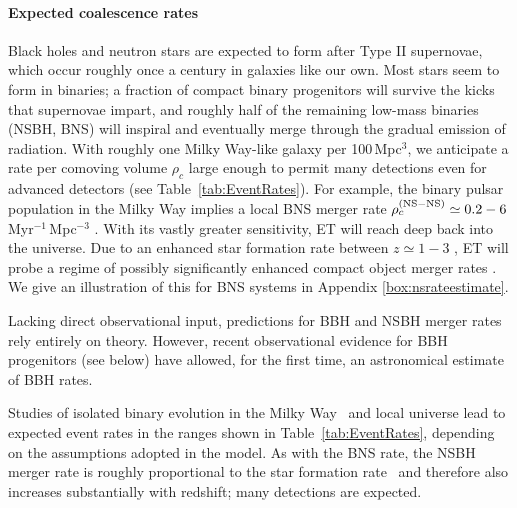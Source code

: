 \paragraph{Expected coalescence rates}
Black holes and neutron stars are expected to form after Type II 
supernovae, which occur roughly once a century in galaxies like our own.  Most stars
seem to form in binaries; a fraction of compact binary progenitors will survive the kicks that
supernovae impart, and roughly half of the remaining low-mass binaries (NSBH, BNS) will 
inspiral and eventually merge through the gradual emission of radiation. With roughly one 
Milky Way-like galaxy per 100\,Mpc$^3$, we anticipate
a rate per comoving volume $\rho_c$ large enough to permit many detections even for advanced
detectors (see Table~\ref{tab:EventRates}).
For example, the binary pulsar population in the Milky Way implies a local BNS merger rate 
$\rho_c^{\rm(NS-NS)}\simeq 0.2-6$\,Myr$^{-1}$\,Mpc$^{-3}$
\cite{Burgay:2003jj,Chunglee-nsns-1,Chunglee-nsns-proceedings}. 
With its vastly greater sensitivity, ET will reach deep back into the universe.
Due to an enhanced star formation rate between $z\simeq 1-3$ \cite{sfr-HopkinsBeacom2006}, 
ET will probe a regime of possibly significantly enhanced compact object merger rates 
\cite{Regimbau:2009,PSellipticals,PSgrbs-popsyn}.
We give an illustration of this for BNS systems in Appendix \ref{box:nsrateestimate}.

Lacking direct observational input, predictions for BBH and NSBH merger 
rates rely entirely on theory. However, recent observational evidence for
BBH progenitors (see below) have allowed, for the first time, an astronomical estimate
of BBH rates.

Studies of isolated binary evolution in the Milky 
Way~\cite{StarTrack2,2006AA...459.1001K,PSmoreconstraints,ChrisBH2007} 
and local universe \cite{PSellipticals} lead to expected event rates in 
the ranges shown in Table~\ref{tab:EventRates}, depending on the assumptions 
adopted in the model.
%
As with the BNS rate, the NSBH merger rate is roughly proportional to 
the star formation rate~\cite{PSgrbs-popsyn} and therefore also increases 
substantially with redshift; many detections are expected.

